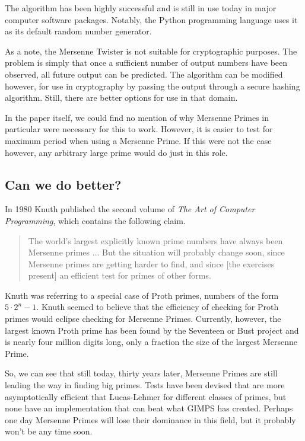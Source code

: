 The algorithm has been highly successful and is still in use today in major computer software packages.  Notably, the Python programming language uses it as its default random number generator.  

As a note, the Mersenne Twister is not suitable for cryptographic purposes. The problem is simply that once a sufficient number of output numbers have been observed, all future output can be predicted.  The algorithm can be modified however, for use in cryptography by passing the output through a secure hashing algorithm\cite{mt}.  Still, there are better options for use in that domain.

In the paper itself, we could find no mention of why Mersenne Primes in particular were necessary for this to work.  However, it is easier to test for maximum period when using a Mersenne Prime\cite{mt2}. If this were not the case however, any arbitrary large prime would do just in this role.
\subsection{Can we do better?}
\label{sec:knuth}
In 1980 Knuth published the second volume of \emph{The Art of Computer Programming}, which contains the following claim.

\begin{quote}
The world’s largest explicitly known prime numbers have always been Mersenne primes ... But the situation will probably change soon, since Mersenne primes are getting harder to find, and since [the exercises present] an efficient test for primes of other forms. \cite{taocp}
\end{quote}

Knuth was referring to a special case of Proth primes, numbers of the form $5\cdot2^n-1$.
Knuth seemed to believe that the efficiency of checking for Proth primes would
eclipse checking for Mersenne Primes. Currently, however, the largest known Proth prime has
been found by the Seventeen or Bust project and is nearly four million digits long, only a fraction the size of the largest Mersenne Prime\cite{seventeenorbust}.

So, we can see that still today, thirty years later, Mersenne Primes are still leading the way in finding big primes.  Tests have been devised that are more asymptotically efficient that Lucas-Lehmer for different classes of primes, but none have an implementation that can beat what GIMPS has created.  Perhaps one day Mersenne Primes will lose their dominance in this field, but it probably won't be any time soon.

